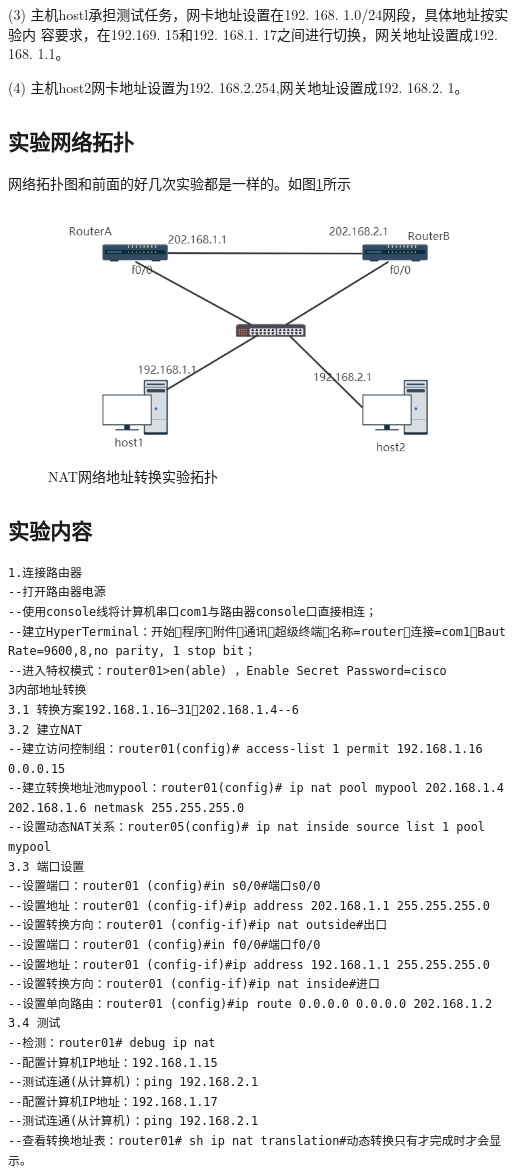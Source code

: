 \documentclass[lang=cn,11pt,a4paper,cite=authoryear]{elegantpaper}
\begin{document}
(3)	主机hostl承担测试任务，网卡地址设置在192. 168. 1.0/24网段，具体地址按实验内 容要求，在192.169. 15和192. 168.1. 17之间进行切换，网关地址设置成192. 168. 1.1。

(4)	主机host2网卡地址设置为192. 168.2.254,网关地址设置成192. 168.2. 1。 

\subsection{实验网络拓扑}

网络拓扑图和前面的好几次实验都是一样的。如图\ref{fig:nat}所示

\begin{figure}[htbp]
	\centering
	\includegraphics[width=0.7\linewidth]{image/screenshot024}
	\caption{NAT网络地址转换实验拓扑}
	\label{fig:nat}
\end{figure}



\subsection{实验内容}
\begin{lstlisting}
1.连接路由器
--打开路由器电源
--使用console线将计算机串口com1与路由器console口直接相连；
--建立HyperTerminal：开始程序附件通讯超级终端名称=router连接=com1Baut Rate=9600,8,no parity, 1 stop bit；
--进入特权模式：router01>en(able) ，Enable Secret Password=cisco
3内部地址转换
3.1 转换方案192.168.1.16—31202.168.1.4--6
3.2 建立NAT
--建立访问控制组：router01(config)# access-list 1 permit 192.168.1.16  0.0.0.15 
--建立转换地址池mypool：router01(config)# ip nat pool mypool 202.168.1.4 202.168.1.6 netmask 255.255.255.0
--设置动态NAT关系：router05(config)# ip nat inside source list 1 pool mypool
3.3 端口设置
--设置端口：router01 (config)#in s0/0#端口s0/0
--设置地址：router01 (config-if)#ip address 202.168.1.1 255.255.255.0
--设置转换方向：router01 (config-if)#ip nat outside#出口
--设置端口：router01 (config)#in f0/0#端口f0/0
--设置地址：router01 (config-if)#ip address 192.168.1.1 255.255.255.0
--设置转换方向：router01 (config-if)#ip nat inside#进口
--设置单向路由：router01 (config)#ip route 0.0.0.0 0.0.0.0 202.168.1.2
3.4 测试
--检测：router01# debug ip nat
--配置计算机IP地址：192.168.1.15
--测试连通(从计算机)：ping 192.168.2.1
--配置计算机IP地址：192.168.1.17
--测试连通(从计算机)：ping 192.168.2.1
--查看转换地址表：router01# sh ip nat translation#动态转换只有才完成时才会显示。
\end{lstlisting}
\end{document}
